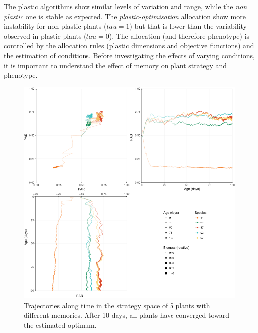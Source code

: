 The plastic algorithms show similar levels of variation and range, while the \textit{non plastic} one is stable as expected. The \textit{plastic-optimisation} allocation show more instability for non plastic plants ($tau = 1$) but that is lower than the variability observed in plastic plants ($tau = 0$). The allocation (and therefore phenotype) is controlled by the allocation rules (plastic dimensions and objective functions) and the estimation of conditions. Before investigating the effects of varying conditions, it is important to understand the effect of memory on plant strategy and phenotype.





\begin{figure}
\includegraphics[width = \textwidth]{./2_PP/Figures/Individual/memory_effect.png}
\caption{Trajectories along time in the strategy space of 5 plants with different memories. After 10 days, all plants have converged toward the estimated optimum.}\label{fig:plastic_allocation_trajectory}
\end{figure}

